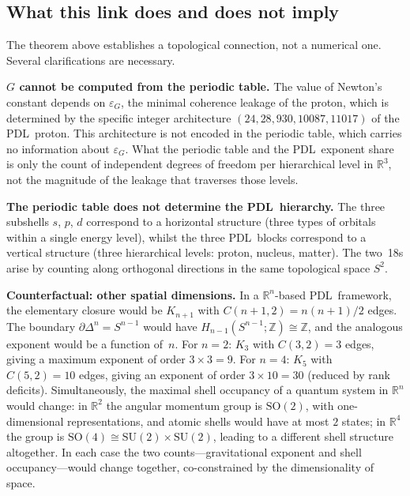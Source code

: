 \documentclass[11pt,a4paper]{article}
\theoremstyle{definition}
\newcommand{\PDL}{\textnormal{PDL}}
\newcommand{\epsg}{\varepsilon_G}
\begin{document}
\subsection{What this link does and does not imply}
\label{subsec:limits}

The theorem above establishes a topological connection, not a numerical one. Several clarifications are necessary.

\medskip\noindent\textbf{$G$ cannot be computed from the periodic table.} The value of Newton's constant depends on $\epsg$, the minimal coherence leakage of the proton, which is determined by the specific integer architecture $(24, 28, 930, 10087, 11017)$ of the \PDL\ proton. This architecture is not encoded in the periodic table, which carries no information about $\epsg$. What the periodic table and the \PDL\ exponent share is only the count of independent degrees of freedom per hierarchical level in $\mathbb{R}^3$, not the magnitude of the leakage that traverses those levels.

\medskip\noindent\textbf{The periodic table does not determine the \PDL\ hierarchy.} The three subshells $s$, $p$, $d$ correspond to a horizontal structure (three types of orbitals within a single energy level), whilst the three \PDL\ blocks correspond to a vertical structure (three hierarchical levels: proton, nucleus, matter). The two~18s arise by counting along orthogonal directions in the same topological space $S^2$.

\medskip\noindent\textbf{Counterfactual: other spatial dimensions.} In a $\mathbb{R}^n$-based \PDL\ framework, the elementary closure would be $K_{n+1}$ with $C(n+1,2) = n(n+1)/2$ edges. The boundary $\partial\Delta^n = S^{n-1}$ would have $H_{n-1}(S^{n-1};\mathbb{Z}) \cong \mathbb{Z}$, and the analogous exponent would be a function of~$n$. For $n = 2$: $K_3$ with $C(3,2) = 3$ edges, giving a maximum exponent of order $3 \times 3 = 9$. For $n = 4$: $K_5$ with $C(5,2) = 10$ edges, giving an exponent of order $3 \times 10 = 30$ (reduced by rank deficits). Simultaneously, the maximal shell occupancy of a quantum system in $\mathbb{R}^n$ would change: in $\mathbb{R}^2$ the angular momentum group is $\mathrm{SO}(2)$, with one-dimensional representations, and atomic shells would have at most $2$ states; in $\mathbb{R}^4$ the group is $\mathrm{SO}(4) \cong \mathrm{SU}(2) \times \mathrm{SU}(2)$, leading to a different shell structure altogether. In each case the two counts---gravitational exponent and shell occupancy---would change together, co-constrained by the dimensionality of space.
\end{document}
